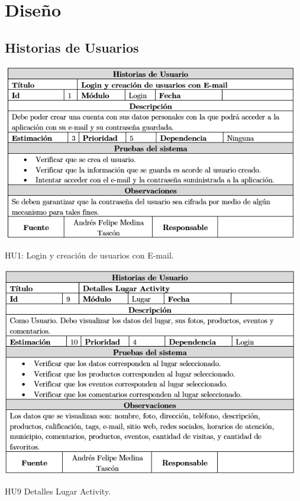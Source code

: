 \documentclass[12pt,letterpaper,openany]{book}
\begin{document}
\section{Diseño}
\subsection{Historias de Usuarios}
\begin{table}[H]
\centering
\includegraphics[width=13cm]{./imagenes/HU/HU1}
\caption{HU1: Login y creación de usuarios con E-mail.}
\end{table}

\begin{table}[H]
\centering
\includegraphics[width=13cm]{./imagenes/HU/HU9}
\caption{HU9 Detalles Lugar Activity.}
\end{table}
\end{document}
